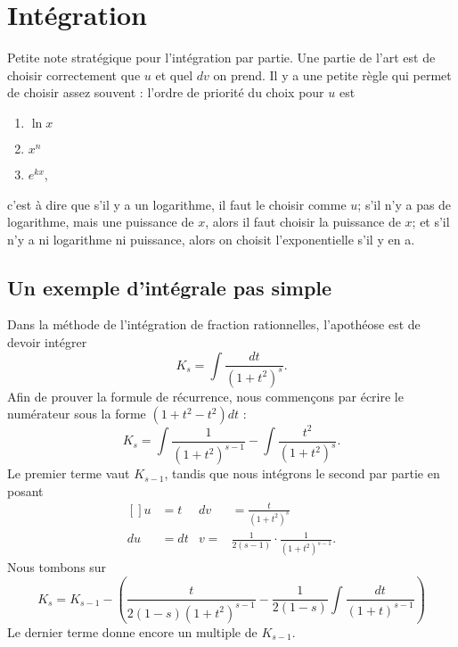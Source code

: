 \section{Intégration}

Petite note stratégique pour l'intégration par partie. Une partie de l'art est de choisir correctement que $u$ et quel $dv$ on prend. Il y a une petite règle qui permet de choisir assez souvent : l'ordre de priorité du choix pour $u$ est
\let\OldTheEnumi\theenumi
\renewcommand{\theenumi}{\arabic{enumi}}
\begin{enumerate}
\item $\ln x$
\item $x^n$
\item $ e^{kx}$,
\end{enumerate}
\let\theenumi\OldTheEnumi
c'est à dire que s'il y a un logarithme, il faut le choisir comme $u$; s'il n'y a pas de
logarithme, mais une puissance de $x$, alors il faut choisir la puissance de $x$; et s'il
n'y a ni logarithme ni puissance, alors on choisit l'exponentielle s'il y en a.

\subsection{Un exemple d'intégrale pas simple}



Dans la méthode de l'intégration de fraction rationnelles, l'apothéose est de devoir intégrer 
\begin{equation}
	K_s=\int \frac{ dt }{ (1+t^2)^s }.
\end{equation}
Afin de prouver la formule de récurrence, nous commençons par écrire le numérateur sous la forme $(1+t^2-t^2)dt$ :
\begin{equation}
	K_s=\int \frac{ 1 }{ (1+t^2)^{s-1} }-\int \frac{ t^2 }{ (1+t^2)^s }.
\end{equation}
Le premier terme vaut $K_{s-1}$, tandis que nous intégrons le second par partie en posant
\begin{equation}
	\begin{aligned}[]
		u&=t		&	dv&=\frac{ t }{ (1+t^2)^s }\\
		du&=dt		&	v=&\frac{1}{ 2(s-1) }\cdot \frac{1}{ (1+t^2)^{s-1} }.
	\end{aligned}
\end{equation}
Nous tombons sur
\begin{equation}
	K_{s}=K_{s-1}-\left( \frac{ t }{ 2(1-s)(1+t^2)^{s-1} } - \frac{1}{ 2(1-s) }\int \frac{ dt }{ (1+t)^{s-1} } \right)
\end{equation}
Le dernier terme donne encore un multiple de $K_{s-1}$.

